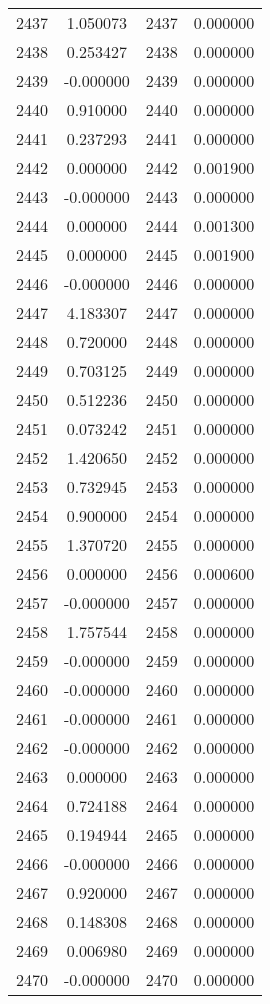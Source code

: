\documentclass[12pt]{article}
\begin{document}
\begin{longtable}{@{}cccc@{}}
2437 & 1.050073 & 2437 & 0.000000 \\
2438 & 0.253427 & 2438 & 0.000000 \\
2439 & -0.000000 & 2439 & 0.000000 \\
2440 & 0.910000 & 2440 & 0.000000 \\
2441 & 0.237293 & 2441 & 0.000000 \\
2442 & 0.000000 & 2442 & 0.001900 \\
2443 & -0.000000 & 2443 & 0.000000 \\
2444 & 0.000000 & 2444 & 0.001300 \\
2445 & 0.000000 & 2445 & 0.001900 \\
2446 & -0.000000 & 2446 & 0.000000 \\
2447 & 4.183307 & 2447 & 0.000000 \\
2448 & 0.720000 & 2448 & 0.000000 \\
2449 & 0.703125 & 2449 & 0.000000 \\
2450 & 0.512236 & 2450 & 0.000000 \\
2451 & 0.073242 & 2451 & 0.000000 \\
2452 & 1.420650 & 2452 & 0.000000 \\
2453 & 0.732945 & 2453 & 0.000000 \\
2454 & 0.900000 & 2454 & 0.000000 \\
2455 & 1.370720 & 2455 & 0.000000 \\
2456 & 0.000000 & 2456 & 0.000600 \\
2457 & -0.000000 & 2457 & 0.000000 \\
2458 & 1.757544 & 2458 & 0.000000 \\
2459 & -0.000000 & 2459 & 0.000000 \\
2460 & -0.000000 & 2460 & 0.000000 \\
2461 & -0.000000 & 2461 & 0.000000 \\
2462 & -0.000000 & 2462 & 0.000000 \\
2463 & 0.000000 & 2463 & 0.000000 \\
2464 & 0.724188 & 2464 & 0.000000 \\
2465 & 0.194944 & 2465 & 0.000000 \\
2466 & -0.000000 & 2466 & 0.000000 \\
2467 & 0.920000 & 2467 & 0.000000 \\
2468 & 0.148308 & 2468 & 0.000000 \\
2469 & 0.006980 & 2469 & 0.000000 \\
2470 & -0.000000 & 2470 & 0.000000 \\

\end{longtable}
\end{document}

